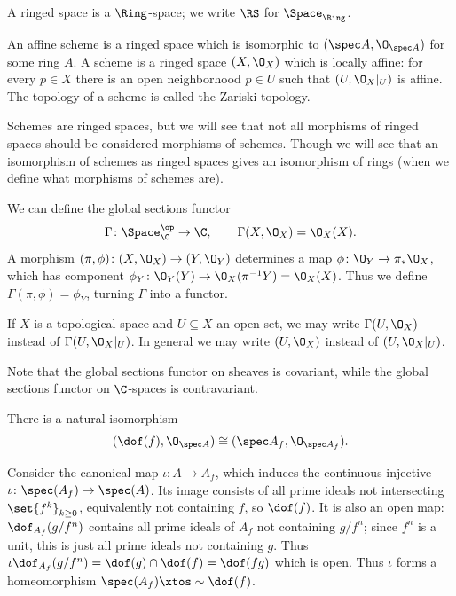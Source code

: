 \bdefn[title={Schemes}]

    A {\emphcolor ringed space} is a $\Ring$-space; we write $\RS$ for $\Space_\Ring$.

    An {\emphcolor affine scheme} is a ringed space which is isomorphic to $(\spec A,\O_{\spec A})$ for some ring $A$.
    A {\emphcolor scheme} is a ringed space $(X,\O_X)$ which is locally affine: for every $p\in X$ there is an open neighborhood $p\in U$ such that $(U,\O_X|_U)$ is affine.
    The topology of a scheme is called the {\emphcolor Zariski topology}.

\edefn

Schemes are ringed spaces, but we will see that not all morphisms of ringed spaces should be considered morphisms of schemes.
Though we will see that an isomorphism of schemes as ringed spaces gives an isomorphism of rings (when we define what
morphisms of schemes are).

We can define the {\emphcolor global sections functor}
$$ \Gamma\colon\Space_\C^\op\to\C,\qquad \Gamma(X,\O_X)=\O_X(X) . $$
A morphism $(\pi,\phi)\colon(X,\O_X)\to(Y,\O_Y)$ determines a map $\phi\colon\O_Y\to\pi_*\O_X$, which has component $\phi_Y\colon\O_Y(Y)\to\O_X(\pi^{-1}Y)=\O_X(X)$.
Thus we define $\Gamma(\pi,\phi)=\phi_Y$, turning $\Gamma$ into a functor.

If $X$ is a topological space and $U\subseteq X$ an open set, we may write $\Gamma(U,\O_X)$ instead of $\Gamma(U,\O_X|_U)$.
In general we may write $(U,\O_X)$ instead of $(U,\O_X|_U)$.

\bnote

    Note that the global sections functor on sheaves is covariant, while the global sections functor on $\C$-spaces is contravariant.

\enote

\blemm

    There is a natural isomorphism
    $$ (\dof(f),\O_{\spec A}) \cong (\spec A_f,\O_{\spec A_f}) . $$

\elemm

\bproof

    Consider the canonical map $\iota\colon A\to A_f$, which induces the continuous injective $\iota\colon\spec(A_f)\to\spec(A)$.
    Its image consists of all prime ideals not intersecting $\set{f^k}_{k\geq0}$, equivalently not containing $f$, so $\dof(f)$.
    It is also an open map: $\dof_{A_f}(g/f^n)$ contains all prime ideals of $A_f$ not containing $g/f^n$; since $f^n$ is a unit, this is just all prime ideals not containing $g$.
    Thus $\iota\dof_{A_f}(g/f^n)=\dof(g)\cap\dof(f)=\dof(fg)$ which is open.
    Thus $\iota$ forms a homeomorphism $\spec(A_f)\xtos\sim\dof(f)$.

